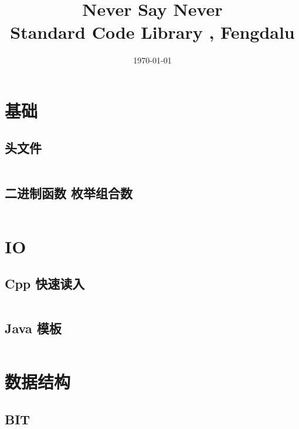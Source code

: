 \documentclass[titlepage,landscape,a4paper,10pt]{article}
\title{\LARGE{Never Say Never} \\
[2ex] \Large{Standard Code Library , Fengdalu} }
\date{\today}
\begin{document}
\maketitle

\begin{multicols*}{2}

    \begin{spacing}{0}
        \tableofcontents
    \end{spacing}
\end{multicols*}

\begin{multicols}{2}

\newpage
\begin{spacing}{0.8}

\section{基础}

\subsection{头文件}
\inputminted{cpp}{Basic/headers.cpp}

\subsection{二进制函数 枚举组合数}
\inputminted{cpp}{Basic/枚举组合.cpp}

\section{IO}

\subsection{Cpp 快速读入}
\inputminted{cpp}{IO/fastio.cpp}

\subsection{Java 模板}
\inputminted{java}{IO/Main.java}

\section{数据结构}

\subsection{BIT}
\inputminted{cpp}{DataStructure/BIT.cpp}


\end{spacing}
\end{multicols}
\end{document}
